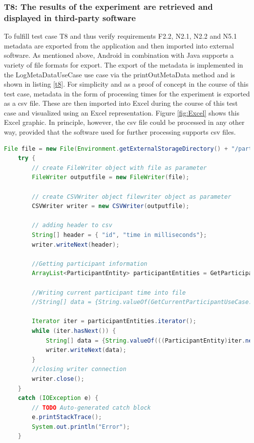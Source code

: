 \subsubsection*{T8: The results of the experiment are retrieved and displayed in third-party software}

To fulfill test case T8 and thus verify requirements F2.2, N2.1, N2.2 and N5.1 metadata are exported from the application and then imported into external software. As mentioned above, Android in combination with Java supports a variety of file formats for export. The export of the metadata is implemented in the LogMetaDataUseCase use case via the printOutMetaData method and is shown in listing \ref{t8}. For simplicity and as a proof of concept in the course of this test case, metadata in the form of processing times for the experiment is exported as a \ac{csv} file. These are then imported into Excel during the course of this test case and visualized using an Excel representation. Figure \ref{fig:Excel} shows this Excel graphic. In principle, however, the \ac{csv} file could be processed in any other way, provided that the software used for further processing supports \ac{csv} files.


\vspace{0.5cm}

\begin{lstlisting}[language=java,label=t8,lineskip={0pt}, caption=T8: Result Collection and Export, basicstyle=\scriptsize, captionpos=b]
    File file = new File(Environment.getExternalStorageDirectory() + "/participant" + GetCurrentParticipantUseCase.getInstance().getCurrentParticipant() + "TimeData.csv");
    try {
        // create FileWriter object with file as parameter
        FileWriter outputfile = new FileWriter(file);

        // create CSVWriter object filewriter object as parameter
        CSVWriter writer = new CSVWriter(outputfile);

        // adding header to csv
        String[] header = { "id", "time in milliseconds"};
        writer.writeNext(header);

        //Getting participant information
        ArrayList<ParticipantEntity> participantEntities = GetParticipantDataUseCase.getInstance().getParticipantData();

        //Writing current participant time into file
        //String[] data = {String.valueOf(GetCurrentParticipantUseCase.getInstance().getCurrentParticipant()), String.valueOf(timeDifference)};

        Iterator iter = participantEntities.iterator();
        while (iter.hasNext()) {
            String[] data = {String.valueOf(((ParticipantEntity)iter.next()).getId()), String.valueOf(((ParticipantEntity)iter.next()).getExperimentTime())};
            writer.writeNext(data);
        }
        //closing writer connection
        writer.close();
    }
    catch (IOException e) {
        // TODO Auto-generated catch block
        e.printStackTrace();
        System.out.println("Error");
    }
\end{lstlisting}

